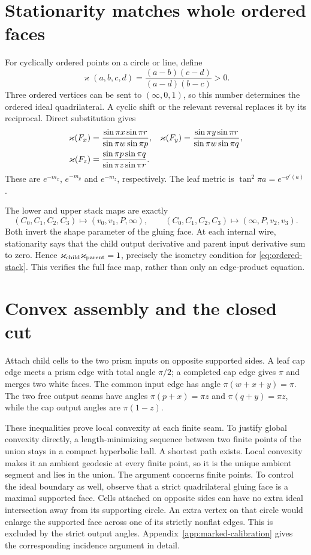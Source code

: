 \section{Stationarity matches whole ordered faces}
For cyclically ordered points on a circle or line, define
\[
 \varkappa(a,b,c,d)=\frac{(a-b)(c-d)}{(a-d)(b-c)}>0.
\]
Three ordered vertices can be sent to $(\infty,0,1)$, so this number determines the ordered ideal quadrilateral. A cyclic shift or the relevant reversal replaces it by its reciprocal. Direct substitution gives
\begin{align}
 \varkappa(F_x)&=\frac{\sin\pi x\sin\pi r}{\sin\pi w\sin\pi p},&
 \varkappa(F_y)&=\frac{\sin\pi y\sin\pi r}{\sin\pi w\sin\pi q},\notag\\
 \varkappa(F_z)&=\frac{\sin\pi p\sin\pi q}{\sin\pi z\sin\pi r}.\label{eq:face-metrics}
\end{align}
These are $e^{-m_x}$, $e^{-m_y}$ and $e^{-m_z}$, respectively. The leaf metric is $\tan^2\pi a=e^{-g'(a)}$.

The lower and upper stack maps are exactly
\begin{equation}\label{eq:ordered-stack}
 (C_0,C_1,C_2,C_3)\mapsto(v_0,v_1,P,\infty),\qquad
 (C_0,C_1,C_2,C_3)\mapsto(\infty,P,v_2,v_3).
\end{equation}
Both invert the shape parameter of the gluing face. At each internal wire, stationarity says that the child output derivative and parent input derivative sum to zero. Hence $\varkappa_{\rm child}\varkappa_{\rm parent}=1$, precisely the isometry condition for \eqref{eq:ordered-stack}. This verifies the full face map, rather than only an edge-product equation.

\section{Convex assembly and the closed cut}
Attach child cells to the two prism inputs on opposite supported sides. A leaf cap edge meets a prism edge with total angle $\pi/2$; a completed cap edge gives $\pi$ and merges two white faces. The common input edge has angle $\pi(w+x+y)=\pi$. The two free output seams have angles $\pi(p+x)=\pi z$ and $\pi(q+y)=\pi z$, while the cap output angles are $\pi(1-z)$.

These inequalities prove local convexity at each finite seam. To justify global convexity directly, a length-minimizing sequence between two finite points of the union stays in a compact hyperbolic ball. A shortest path exists. Local convexity makes it an ambient geodesic at every finite point, so it is the unique ambient segment and lies in the union. The argument concerns finite points. To control the ideal boundary as well, observe that a strict quadrilateral gluing face is a maximal supported face. Cells attached on opposite sides can have no extra ideal intersection away from its supporting circle. An extra vertex on that circle would enlarge the supported face across one of its strictly nonflat edges. This is excluded by the strict output angles. Appendix~\ref{app:marked-calibration} gives the corresponding incidence argument in detail.

